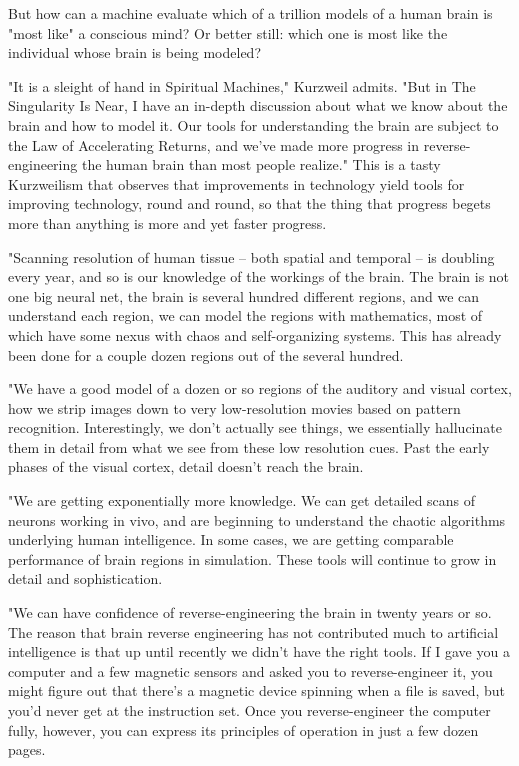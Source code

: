 But how can a machine evaluate which of a trillion models of a
human brain is "most like" a conscious mind? Or better still: which
one is most like the individual whose brain is being modeled?

"It is a sleight of hand in Spiritual Machines," Kurzweil admits.
"But in The Singularity Is Near, I have an in-depth discussion
about what we know about the brain and how to model it. Our tools
for understanding the brain are subject to the Law of Accelerating
Returns, and we've made more progress in reverse-engineering the
human brain than most people realize." This is a tasty Kurzweilism
that observes that improvements in technology yield tools for
improving technology, round and round, so that the thing that
progress begets more than anything is more and yet faster
progress.

"Scanning resolution of human tissue -- both spatial and temporal
-- is doubling every year, and so is our knowledge of the workings
of the brain. The brain is not one big neural net, the brain is
several hundred different regions, and we can understand each
region, we can model the regions with mathematics, most of which
have some nexus with chaos and self-organizing systems. This has
already been done for a couple dozen regions out of the several
hundred.

"We have a good model of a dozen or so regions of the auditory and
visual cortex, how we strip images down to very low-resolution
movies based on pattern recognition. Interestingly, we don't
actually see things, we essentially hallucinate them in detail from
what we see from these low resolution cues. Past the early phases
of the visual cortex, detail doesn't reach the brain.

"We are getting exponentially more knowledge. We can get detailed
scans of neurons working in vivo, and are beginning to understand
the chaotic algorithms underlying human intelligence. In some
cases, we are getting comparable performance of brain regions in
simulation. These tools will continue to grow in detail and
sophistication.

"We can have confidence of reverse-engineering the brain in twenty
years or so. The reason that brain reverse engineering has not
contributed much to artificial intelligence is that up until
recently we didn't have the right tools. If I gave you a computer
and a few magnetic sensors and asked you to reverse-engineer it,
you might figure out that there's a magnetic device spinning when a
file is saved, but you'd never get at the instruction set. Once you
reverse-engineer the computer fully, however, you can express its
principles of operation in just a few dozen pages.

